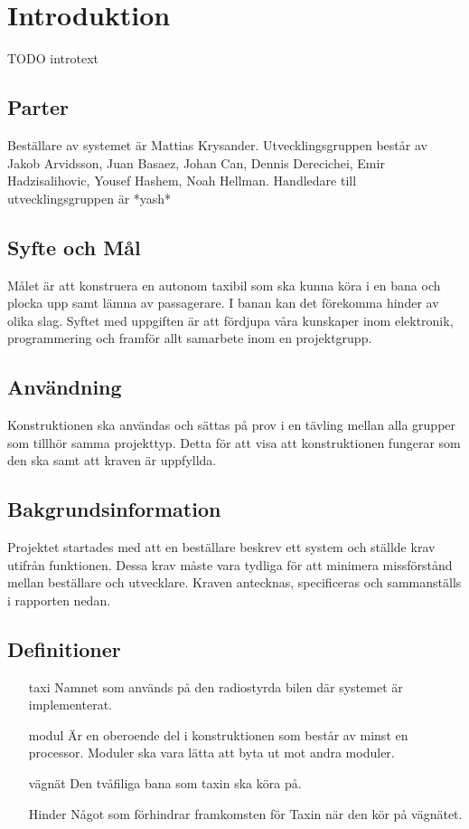 \documentclass[krav.tex]{subfiles}
\begin{document}
\section{Introduktion}
TODO introtext

\subsection{Parter}
Beställare av systemet är Mattias Krysander.  Utvecklingsgruppen består av
Jakob Arvidsson, Juan Basaez, Johan Can, Dennis Derecichei, Emir
Hadzisalihovic, Yousef Hashem, Noah Hellman.  Handledare till
utvecklingsgruppen är *yash*

\subsection{Syfte och Mål}
Målet är att konstruera en autonom taxibil som ska kunna köra i en bana och
plocka upp samt lämna av passagerare. I banan kan det förekomma hinder av olika
slag. Syftet med uppgiften är att fördjupa våra kunskaper inom elektronik,
programmering och framför allt samarbete inom en projektgrupp.

\subsection{Användning}
Konstruktionen ska användas och sättas på prov i en tävling mellan alla grupper som tillhör samma projekttyp. Detta för att visa att konstruktionen fungerar som den ska samt att kraven är uppfyllda.

\subsection{Bakgrundsinformation}
Projektet startades med att en beställare beskrev ett system och ställde krav
utifrån funktionen. Dessa krav måste vara tydliga för att minimera missförstånd
mellan beställare och utvecklare. Kraven antecknas, specificeras och
sammanställs i rapporten nedan.

\subsection{Definitioner}
\begin{itemize}
    \item[taxi] Namnet som används på den radiostyrda bilen där systemet är implementerat.
    \item[modul] Är en oberoende del i konstruktionen som består av minst en processor. Moduler ska vara lätta att byta ut mot andra moduler.
    \item[vägnät] Den tvåfiliga bana som taxin ska köra på.
    \item[Hinder] Något som förhindrar framkomsten för Taxin när den kör på vägnätet.
\end{itemize}
\end{document}
